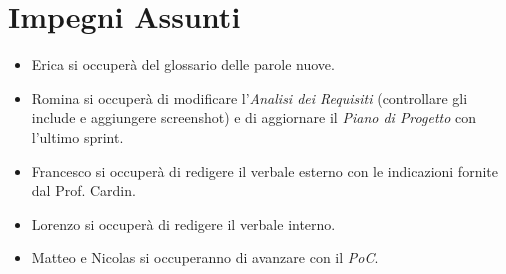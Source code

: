 \documentclass[a4paper, 12pt]{article}
\begin{document}
\section*{Impegni Assunti}
\begin{itemize}
    \item Erica si occuperà del glossario delle parole nuove.
    \item Romina si occuperà di modificare l'\textit{Analisi dei Requisiti} (controllare gli include e aggiungere screenshot) e di aggiornare il \textit{Piano di Progetto} con l'ultimo sprint.
    \item Francesco si occuperà di redigere il verbale esterno con le indicazioni fornite dal Prof. Cardin.
    \item Lorenzo si occuperà di redigere il verbale interno.
    \item Matteo e Nicolas si occuperanno di avanzare con il \textit{PoC}.
\end{itemize}
\end{document}

